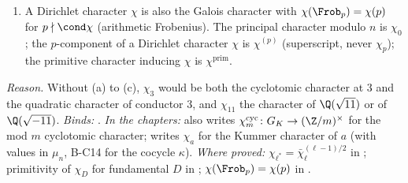 \begin{convention}[B-C6: characters]
\begin{enumerate}[label=(\alph*)]
$G_{\Q_q}$ of order at most $2$ in the Tate shape (B-C14): at a multiplicative prime it is unramified, with $\varepsilon(\Frob_q)=a_q(E)$; at an
additive prime with $v_q(j)<0$ (type $\mathrm I_n^*$ for odd $q$) it is a ramified quadratic character, so that $\rho$ is the multiplicative shape
twisted by a ramified quadratic character, which $\ad\rho$ does not see.
$\psi$ is the character of order $4$ of $C_4=\langle J\rangle$ with $\psi(J)=i\in\F_9^\times$ (the character of order $4$ of Proposition prop:ns).
\item A Dirichlet character $\chi$ is also the Galois character with $\chi(\Frob_p)=\chi(p)$ for $p\nmid\cond\chi$ (arithmetic Frobenius).
The principal character modulo $n$ is $\chi_0$; the $p$-component of a Dirichlet character $\chi$ is $\chi^{(p)}$ (superscript, never
$\chi_p$); the primitive character inducing $\chi$ is $\chi^{\mathrm{prim}}$.
\end{enumerate}
\end{convention}

\noindent\emph{Reason.} Without (a) to (c), $\chi_3$ would be both the cyclotomic character at $3$ and the quadratic character of
conductor $3$, and $\chi_{11}$ the character of $\Q(\sqrt{11})$ or of $\Q(\sqrt{-11})$. \emph{Binds:}
.
\emph{In the chapters:}  also writes $\chi_m^{\mathrm{cyc}}\colon G_K\to(\Z/m)^\times$ for the mod $m$ cyclotomic
character;  writes $\chi_a$ for the Kummer character of $a$ (with values in $\mu_n$, B-C14 for the cocycle
$\kappa$). \emph{Where proved:} $\chi_{\ell^*}=\bar\chi_\ell^{(\ell-1)/2}$ in ; primitivity of $\chi_D$ for fundamental $D$ in
; $\chi(\Frob_p)=\chi(p)$ in .

